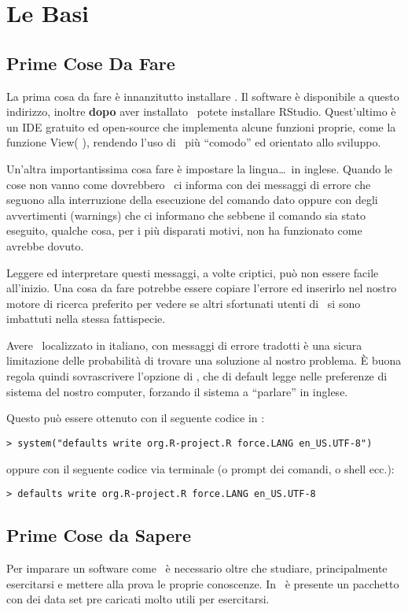 \chapter{Le Basi}
\section{Prime Cose Da Fare}
La prima cosa da fare è innanzitutto installare \erre. Il software è disponibile a questo indirizzo, inoltre \textbf{dopo} aver installato \erre\ potete installare \textsf{RStudio}. Quest'ultimo è un \textsf{IDE} gratuito ed open-source che implementa alcune funzioni proprie, come la funzione \textsf{View( )}, rendendo l'uso di \erre\ più ``comodo'' ed orientato allo sviluppo.

Un'altra importantissima cosa fare è impostare la lingua\dots\ in inglese.
Quando le cose non vanno come dovrebbero \erre\ ci informa con dei messaggi di errore che seguono alla interruzione della esecuzione del comando dato oppure con degli avvertimenti (warnings) che ci informano che sebbene il comando sia stato eseguito, qualche cosa, per i più disparati motivi, non ha funzionato come avrebbe dovuto.

Leggere ed interpretare questi messaggi, a volte criptici, può non essere facile all'inizio. Una cosa da fare potrebbe essere copiare l'errore ed inserirlo nel nostro motore di ricerca preferito per vedere se altri sfortunati utenti di \erre\ si sono imbattuti nella stessa fattispecie.

Avere \erre\ localizzato in italiano, con messaggi di errore tradotti è una sicura limitazione delle probabilità di trovare una soluzione al nostro problema. È buona regola quindi sovrascrivere l'opzione di \erre, che di default legge nelle preferenze di sistema del nostro computer, forzando il sistema a ``parlare'' in inglese.

Questo può essere ottenuto con il seguente codice in \erre:
\begin{lstlisting}
> system("defaults write org.R-project.R force.LANG en_US.UTF-8")
\end{lstlisting}
oppure con il seguente codice via terminale (o prompt dei comandi, o shell ecc.):
\begin{lstlisting}
> defaults write org.R-project.R force.LANG en_US.UTF-8
\end{lstlisting}

\section{Prime Cose da Sapere}
Per imparare un software come \erre\ è necessario oltre che studiare, principalmente esercitarsi e mettere alla prova le proprie conoscenze. In \erre\ è presente un pacchetto con dei data set pre caricati molto utili per esercitarsi.

